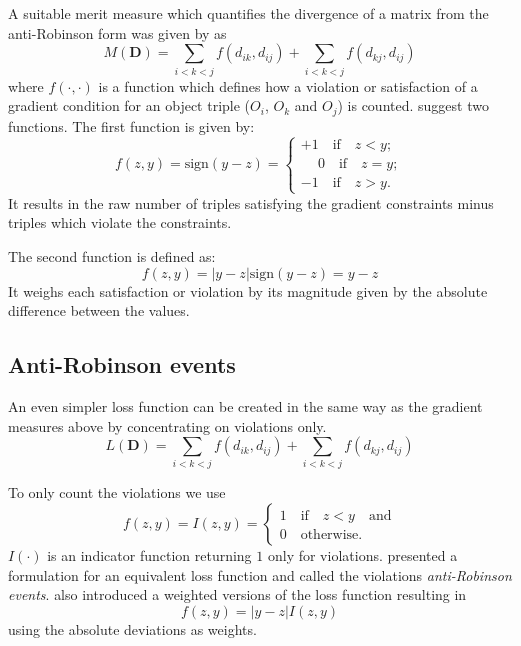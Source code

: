 \documentclass[fleqn, a4paper]{article}
\begin{document}
A suitable merit measure which quantifies the divergence of a matrix from the
anti-Robinson form was given by \cite{seriation:Hubert:1987} as
\begin{equation}
    M(\mathbf{D}) = 
    \sum_{i<k<j}f(d_{ik}, d_{ij}) + \sum_{i<k<j}f(d_{kj}, d_{ij}) 
    \label{equ:gradient}
\end{equation}
where $f(\cdot,\cdot)$ is a function which defines how a violation or
satisfaction of a gradient condition for an object triple ($O_i$, $O_k$ and
$O_j$) is counted.  \cite{seriation:Hubert:1987} suggest two functions. The
first function is given by:
\begin{equation}
    f(z,y) = \mathrm{sign}(y-z) = 
    \begin{cases}
        +1 \quad \text{if} \quad z < y; \\
        \phantom{+}0 \quad \text{if} \quad z = y; \\
        -1 \quad \text{if} \quad z > y.
    \end{cases}
\end{equation}
It results in the raw number of triples satisfying the gradient
constraints minus triples which violate the constraints. 

The second function is defined as:
\begin{equation}
    f(z,y) = |y-z|\mathrm{sign}(y-z) = y-z
\end{equation}
It weighs each satisfaction or violation by its
magnitude given by the absolute difference between the values.

\subsection{Anti-Robinson events}
An even simpler loss function can be created in the same way as the gradient
measures above by concentrating on violations only. 
\begin{equation}
    L(\mathbf{D}) = 
    \sum_{i<k<j}f(d_{ik}, d_{ij}) + \sum_{i<k<j}f(d_{kj}, d_{ij}) 
\end{equation}

To only count the violations we use
\begin{equation}
    f(z, y) = I(z, y) = 
    \begin{cases}
        1 \quad \text{if} \quad z < y \quad \text{and} \\
        0 \quad \text{otherwise.}
    \end{cases}
\end{equation}
$I(\cdot)$ is an indicator function returning $1$ only for violations.
\cite{seriation:Chen:2002} presented a formulation for an equivalent 
loss function and called the violations \emph{anti-Robinson events}.
\cite{seriation:Chen:2002} also introduced a weighted versions of the loss 
function resulting in
\begin{equation}
    f(z, y) = |y-z|I(z, y)
\end{equation}
using the absolute deviations as weights.
\end{document}
